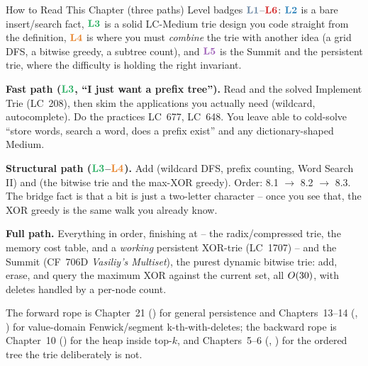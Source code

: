 \begin{chaptertheorybox}{How to Read This Chapter (three paths)}
Level badges $\lv1$--$\lv6$: $\lv2$ is a bare insert/search fact, $\lv3$ is a solid LC-Medium trie
design you code straight from the definition, $\lv4$ is where you must \emph{combine} the trie with
another idea (a grid DFS, a bitwise greedy, a subtree count), and $\lv5$ is the Summit and the
persistent trie, where the difficulty is holding the right invariant.

\textbf{Fast path ($\lv3$, ``I just want a prefix tree'').} Read  and the solved
Implement Trie (LC~208), then skim the applications you actually need (wildcard, autocomplete). Do the
practices LC~677, LC~648. You leave able to cold-solve ``store words, search a word, does a prefix
exist'' and any dictionary-shaped Medium.

\textbf{Structural path ($\lv3$--$\lv4$).} Add  (wildcard DFS, prefix counting,
Word Search II) and  (the bitwise trie and the max-XOR greedy). Order:
8.1 $\to$ 8.2 $\to$ 8.3. The bridge fact is that a bit is just a two-letter character -- once you see
that, the XOR greedy is the same walk you already know.

\textbf{Full path.} Everything in order, finishing at  -- the radix/compressed trie,
the memory cost table, and a \emph{working} persistent XOR-trie (LC~1707) -- and the Summit
(CF~706D \emph{Vasiliy's Multiset}), the purest dynamic bitwise trie: add, erase, and query the maximum
XOR against the current set, all $O(30)$, with deletes handled by a per-node count.

The forward rope is Chapter~21 () for general persistence and Chapters~13--14
(, ) for value-domain Fenwick/segment k-th-with-deletes; the backward rope is
Chapter~10 () for the heap inside top-$k$, and Chapters~5--6 (, ) for
the ordered tree the trie deliberately is not.
\end{chaptertheorybox}


